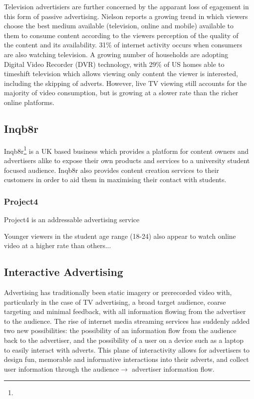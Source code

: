 	Television advertisiers are further concerned by the apparant loss of egagement in this form of passive advertising. Nielson reports a growing trend in which viewers choose the best medium available (television, online and mobile) available to them to consume content according to the viewers perception of the quality of the content and its availability. 31\% of internet activity occurs when consumers are also watching television. A growing number of households are adopting Digital Video Recorder (DVR) technology, with 29\% of US homes able to timeshift television which allows viewing only content the viewer is interested, including the skipping of adverts. However, live TV viewing still accounts for the majority of video consumption, but is growing at a slower rate than the richer online platforms. \citep{three-screen}


	\subsection{Inqb8r}

	Inqb8r\footnote{} is a UK based business which provides a platform for content owners and advertisers alike to expose their own products and services to a university student focused audience. Inqb8r also provides content creation services to their customers in order to aid them in maximising their contact with students.

	\subsubsection{Project4}

	Project4 is an addressable advertising service

	Younger viewers in the student age range (18-24) also appear to watch online video at a higher rate than others...


	\subsection{Interactive Advertising}

	Advertising has traditionally been static imagery or prerecorded video with, particularly in the case of TV advertising, a broad target audience, coarse targeting and minimal feedback, with all information flowing from the advertiser to the audience. The rise of internet media streaming services has suddenly added two new possibilities: the possibility of an information flow from the audience back to the advertiser, and the possibility of a user on a device such as a laptop to easily interact with adverts. This plane of interactivity allows for advertisers to design fun, memorable and informative interactions into their adverts, and collect user information through the audience$\rightarrow$ advertiser information flow.

